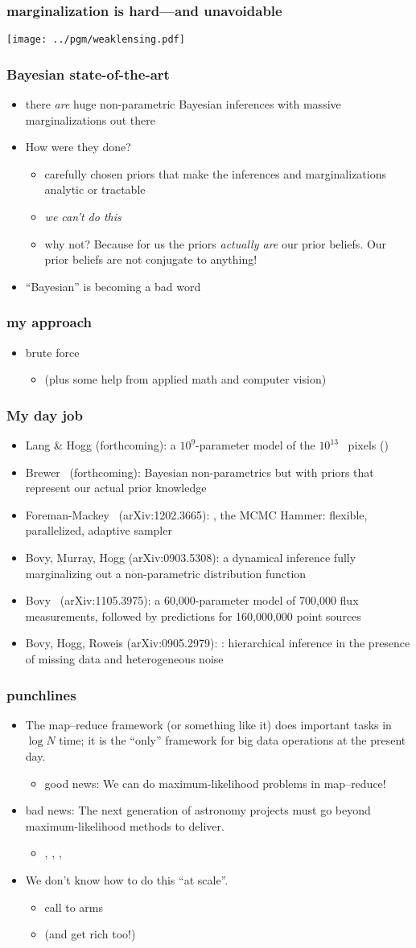\documentclass[pdftex]{beamer}
\newcommand{\conclusion}{
\begin{frame}
  \frametitle{punchlines}
  \begin{itemize}
  \item The map--reduce framework (or something like it) does
    important tasks in $\log N$ time; it is the ``only'' framework
    for big data operations at the present day.
    \begin{itemize}
    \item good news: We can do maximum-likelihood problems in map--reduce!
    \end{itemize}
  \item bad news:  The next generation of astronomy projects must go beyond
    maximum-likelihood methods to deliver.
    \begin{itemize}
    \item \gaia, \lsst, \euclid, \etc
    \end{itemize}
  \item We don't know how to do this ``at scale''.
    \begin{itemize}
    \item call to arms
    \item (and get rich too!)
    \end{itemize}
  \end{itemize}
\end{frame}
}
\begin{document}
\begin{frame}
  \frametitle{marginalization is hard---and unavoidable}
  \texttt{[image: ../pgm/weaklensing.pdf]}
\end{frame}

\begin{frame}
  \frametitle{Bayesian state-of-the-art}
  \begin{itemize}
  \item there \emph{are} huge non-parametric Bayesian inferences with
    massive marginalizations out there
  \item How were they done?
    \begin{itemize}
    \item carefully chosen priors that make the inferences and
      marginalizations analytic or tractable
    \item \emph{we can't do this}
    \item why not?  Because for us the priors \emph{actually are} our
      prior beliefs.  Our prior beliefs are not conjugate to anything!
    \end{itemize}
  \item ``Bayesian'' is becoming a bad word
  \end{itemize}
\end{frame}

\begin{frame}
  \frametitle{my approach}
  \begin{itemize}
  \item brute force
    \begin{itemize}
    \item (plus some help from applied math and computer vision)
    \end{itemize}
  \end{itemize}
\end{frame}

\begin{frame}
  \frametitle{My day job}
  \begin{itemize}
  \item Lang \& Hogg {\small(forthcoming)}: a $10^9$-parameter model of the
    $10^{13}$ \sdss\ pixels ()
  \item Brewer \etal\ {\small(forthcoming)}: Bayesian non-parametrics but with
    priors that represent our actual prior knowledge
  \item Foreman-Mackey \etal\ {\small(arXiv:1202.3665)}:
    , the MCMC Hammer: flexible, parallelized, adaptive
    sampler
  \item Bovy, Murray, Hogg {\small(arXiv:0903.5308)}: a dynamical inference
    fully marginalizing out a non-parametric distribution function
  \item Bovy \etal\ {\small(arXiv:1105.3975)}: a 60,000-parameter model of
    700,000 flux measurements, followed by predictions for 160,000,000
    point sources
  \item Bovy, Hogg, Roweis {\small(arXiv:0905.2979)}: : hierarchical inference in the presence of missing
    data and heterogeneous noise
  \end{itemize}
\end{frame}

\conclusion
\end{document}
